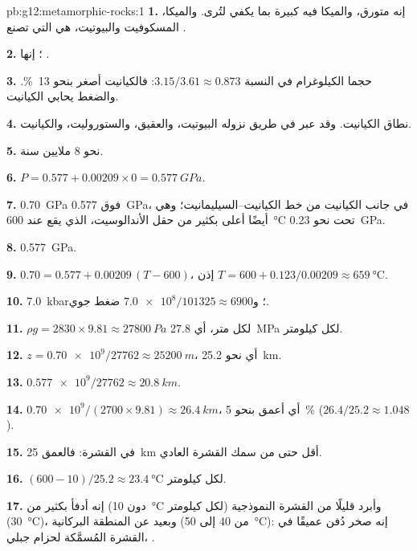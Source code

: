 \begin{solution}{pb:g12:metamorphic-rocks:1}
\textbf{1.} إنه متورق، والميكا فيه كبيرة بما يكفي لتُرى.
والميكا، المسكوفيت والبيوتيت، هي التي تصنع .

\textbf{2.} ؛ إنها .

\textbf{3.} حجما الكيلوغرام في النسبة $3.15/3.61 \approx
0.873$: فالكيانيت أصغر بنحو \qty{13}{\percent}. والضغط يحابي
الكيانيت.

\textbf{4.} نطاق الكيانيت. وقد عبر في طريق نزوله  البيوتيت،
والعقيق، والستوروليت، والكيانيت.

\textbf{5.} نحو 8 ملايين سنة.

\textbf{6.} $P = 0.577 + 0.00209 \times 0 = \qty{0.577}{GPa}$.

\textbf{7.} \qty{0.70}{GPa} فوق \qty{0.577}{GPa}، في جانب الكيانيت من
خط الكيانيت--السيليمانيت؛ وهي أيضًا أعلى بكثير من حقل الأندالوسيت،
الذي يقع عند \qty{600}{\celsius} تحت نحو \qty{0.23}{GPa}.

\textbf{8.} \qty{0.577}{GPa}.

\textbf{9.} $0.70 = 0.577 + 0.00209\,(T - 600)$، إذن $T = 600 +
0.123/0.00209 \approx \qty{659}{\celsius}$.

\textbf{10.} \qty{7.0}{kbar}؛ و$\num{7.0e8}/101325 \approx \num{6900}$
ضغط جوي.

\textbf{11.} $\rho g = 2830 \times 9.81 \approx \qty{27800}{Pa}$ لكل متر،
أي \qty{27.8}{MPa} لكل كيلومتر.

\textbf{12.} $z = \num{0.70e9}/\num{27762} \approx \qty{25200}{m}$، أي نحو
\qty{25.2}{km}.

\textbf{13.} $\num{0.577e9}/\num{27762} \approx \qty{20.8}{km}$.

\textbf{14.} $\num{0.70e9}/(2700 \times 9.81) \approx \qty{26.4}{km}$، أي أعمق
بنحو \qty{5}{\percent} ($26.4/25.2 \approx 1.048$).

\textbf{15.} في القشرة: فالعمق \qty{25}{km} أقل حتى من سمك القشرة
العادي.

\textbf{16.} $(600 - 10)/25.2 \approx \qty{23.4}{\celsius}$ لكل كيلومتر.

\textbf{17.} إنه أدفأ بكثير من  (دون
\qty{10}{\celsius} لكل كيلومتر) وأبرد قليلًا من القشرة النموذجية
(\qty{30}{\celsius})، وبعيد عن المنطقة البركانية (من 40 إلى \qty{50}{\celsius}): إنه
صخر دُفن عميقًا في القشرة المُسمَّكة لحزام جبلي، .


\end{solution}
